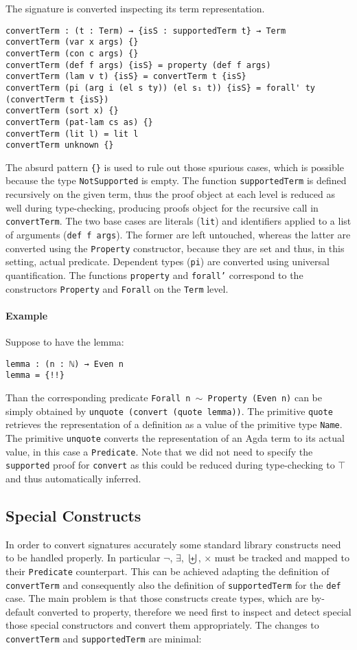 \documentclass[10pt,a4paper]{article}
\begin{document}
The signature is converted inspecting its term representation.
\begin{verbatim}
convertTerm : (t : Term) → {isS : supportedTerm t} → Term
convertTerm (var x args) {}
convertTerm (con c args) {}
convertTerm (def f args) {isS} = property (def f args)
convertTerm (lam v t) {isS} = convertTerm t {isS}
convertTerm (pi (arg i (el s ty)) (el s₁ t)) {isS} = forall' ty (convertTerm t {isS})
convertTerm (sort x) {}
convertTerm (pat-lam cs as) {}
convertTerm (lit l) = lit l
convertTerm unknown {}
\end{verbatim}
The absurd pattern \texttt{\{\}} is used to rule out those spurious cases, which is possible because the type \texttt{NotSupported} is empty.
The function \texttt{supportedTerm} is defined recursively on the given term, thus the proof object at each level is reduced as well during type-checking, producing proofs object for the recursive call in \texttt{convertTerm}. The two base cases are literals (\texttt{lit}) and identifiers applied to a list of arguments (\texttt{def f args}). The former are left untouched, whereas the latter are converted using the \texttt{Property} constructor, because they are set and thus, in this setting, actual predicate.
Dependent types (\texttt{pi}) are converted using universal quantification.
The functions \texttt{property} and \texttt{forall'} correspond to the constructors \texttt{Property} and \texttt{Forall} on the \texttt{Term} level.

\paragraph{Example}
Suppose to have the lemma:
\begin{verbatim}
lemma : (n : ℕ) → Even n
lemma = {!!}
\end{verbatim}
Than the corresponding predicate \texttt{Forall n $\sim$ Property (Even n)} can be simply obtained by \texttt{unquote (convert (quote lemma))}.
The primitive \texttt{quote} retrieves the representation of a definition as a value of the primitive type \texttt{Name}.
The primitive \texttt{unquote} converts the representation of an Agda term to its actual value, in this case a \texttt{Predicate}. Note that we did not need to specify the \texttt{supported} proof for \texttt{convert} as this could be reduced during type-checking to \texttt{$\top$} and thus automatically inferred.

\subsection{Special Constructs}
In order to convert signatures accurately some standard library constructs need to be handled properly. In particular $\neg$, $\exists$, $\biguplus$, $\times$ must be tracked and mapped to their \texttt{Predicate} counterpart.
This can be achieved adapting the definition of \texttt{convertTerm} and consequently also the definition of \texttt{supportedTerm} for the \texttt{def} case. The main problem is that those constructs create types, which are by-default converted to property, therefore we need first to inspect and detect special those special constructors and convert them appropriately. The changes to \texttt{convertTerm} and \texttt{supportedTerm} are minimal:
\end{document}
